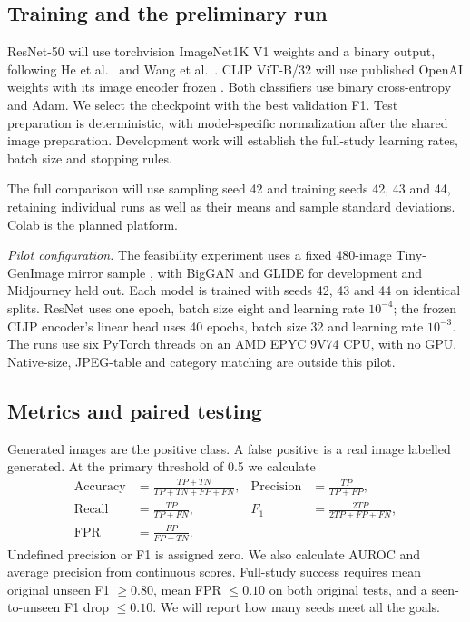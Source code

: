 \subsection{Training and the preliminary run}
ResNet-50 will use torchvision ImageNet1K V1 weights and a binary output, following He et al.\ \citep{he2016} and Wang et al.\ \citep{wang2020}. CLIP ViT-B/32 will use published OpenAI weights with its image encoder frozen \citep{radford2021,ojha2023}. Both classifiers use binary cross-entropy and Adam. We select the checkpoint with the best validation F1. Test preparation is deterministic, with model-specific normalization after the shared image preparation. Development work will establish the full-study learning rates, batch size and stopping rules.

The full comparison will use sampling seed 42 and training seeds 42, 43 and 44, retaining individual runs as well as their means and sample standard deviations. Colab is the planned platform.

\noindent\textit{Pilot configuration.} The feasibility experiment uses a fixed 480-image Tiny-GenImage mirror sample \citep{tinygen2026}, with BigGAN and GLIDE for development and Midjourney held out. Each model is trained with seeds 42, 43 and 44 on identical splits. ResNet uses one epoch, batch size eight and learning rate $10^{-4}$; the frozen CLIP encoder's linear head uses 40 epochs, batch size 32 and learning rate $10^{-3}$. The runs use six PyTorch threads on an AMD EPYC 9V74 CPU, with no GPU. Native-size, JPEG-table and category matching are outside this pilot.

\subsection{Metrics and paired testing}
Generated images are the positive class. A false positive is a real image labelled generated. At the primary threshold of 0.5 we calculate
\begin{align}
\mathrm{Accuracy}&=\frac{TP+TN}{TP+TN+FP+FN}, &
\mathrm{Precision}&=\frac{TP}{TP+FP},\\
\mathrm{Recall}&=\frac{TP}{TP+FN}, &
F_1&=\frac{2TP}{2TP+FP+FN},\\
\mathrm{FPR}&=\frac{FP}{FP+TN}.&&
\end{align}
Undefined precision or F1 is assigned zero. We also calculate AUROC and average precision from continuous scores. Full-study success requires mean original unseen F1 $\geq0.80$, mean FPR $\leq0.10$ on both original tests, and a seen-to-unseen F1 drop $\leq0.10$. We will report how many seeds meet all the goals.

